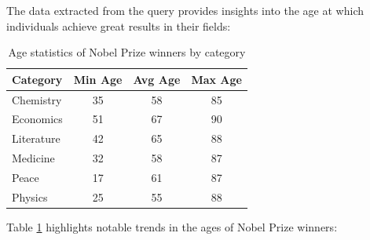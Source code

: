 \documentclass{article}
\begin{document}
\vspace{1em}

The data extracted from the query provides insights into the age at which individuals achieve great results in
their fields:

\begin{table}[H]
	\centering
	\begin{tabular}{|l|c|c|c|}
		\hline
		\textbf{Category} & \textbf{Min Age} & \textbf{Avg Age} & \textbf{Max Age} \\ \hline
		Chemistry         & 35               & 58               & 85               \\ \hline
		Economics         & 51               & 67               & 90               \\ \hline
		Literature        & 42               & 65               & 88               \\ \hline
		Medicine          & 32               & 58               & 87               \\ \hline
		Peace             & 17               & 61               & 87               \\ \hline
		Physics           & 25               & 55               & 88               \\ \hline
	\end{tabular}
	\caption{Age statistics of Nobel Prize winners by category}
	\label{tab:age_analysis}
\end{table}

Table \ref{tab:age_analysis} highlights notable trends in the ages of Nobel Prize winners:
\end{document}
